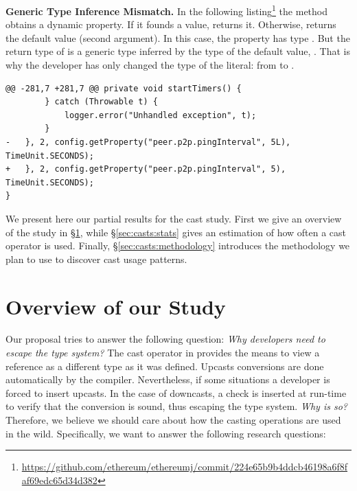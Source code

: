 \textbf{Generic Type Inference Mismatch.}
In the following listing\footnote{\url{https://github.com/ethereum/ethereumj/commit/224e65b9b4ddcb46198a6f8faf69edc65d34d382}}
the  method obtains a dynamic property. If it founds a value, returns it. Otherwise, returns the default value (second argument).
In this case, the property  has type .
But the return type of  is a generic type inferred by the type of the default value, .
That is why the developer has only changed the type of the literal: from  to .

\begin{lstlisting}[style=java]
@@ -281,7 +281,7 @@ private void startTimers() {
        } catch (Throwable t) {
            logger.error("Unhandled exception", t);
        }
-   }, 2, config.getProperty("peer.p2p.pingInterval", 5L), TimeUnit.SECONDS);
+   }, 2, config.getProperty("peer.p2p.pingInterval", 5), TimeUnit.SECONDS);
}
\end{lstlisting}


We present here our partial results for the cast study.
First we give an overview of the study in \S\ref{sec:casts:overview},
while \S\ref{sec:casts:stats} gives an estimation of how often a cast operator is used.
Finally, \S\ref{sec:casts:methodology} introduces the methodology we plan to use to discover cast usage patterns.

\section{Overview of our Study}
\label{sec:casts:overview}

Our proposal tries to answer the following question: \emph{Why developers need to escape the type system?}
The cast operator in \java{} provides the means to view a reference as a different type as it was defined.
Upcasts conversions are done automatically by the compiler.
Nevertheless, if some situations a developer is forced to insert upcasts.
In the case of downcasts, a check is inserted at run-time to verify that the conversion is sound, thus escaping the type system.
\emph{Why is so?}
Therefore, we believe we should care about how the casting operations are used in the wild.
Specifically, we want to answer the following research questions:

